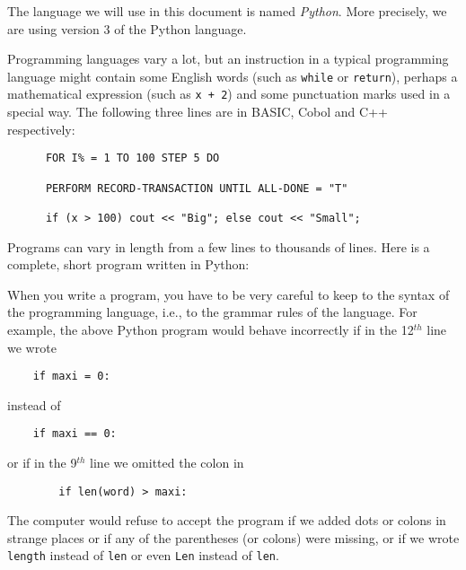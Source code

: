 
The language we will use in this document is named \emph{Python}.
More precisely, we are using version 3 of the Python language.

Programming languages vary a lot, but
an instruction in a typical programming language might contain
some English words (such as \verb!while! or \verb!return!), perhaps a mathematical
expression (such as \verb!x + 2!) and some punctuation marks used in a special way.
The following three lines are in BASIC, Cobol and C++ respectively:
\begin{Verbatim}
      FOR I% = 1 TO 100 STEP 5 DO

      PERFORM RECORD-TRANSACTION UNTIL ALL-DONE = "T"

      if (x > 100) cout << "Big"; else cout << "Small";
\end{Verbatim}

Programs can vary in length from a few lines to thousands of lines.
Here is a complete, short program written in Python:


\pagebreak

When you write a program, you have to be very careful to keep to the
syntax of the programming language, i.e., to the grammar rules of the language.
For example, the above Python program would
behave incorrectly if in the 12$^{th}$ line we wrote

\begin{Verbatim}
    if maxi = 0:
\end{Verbatim}

instead of 

\begin{Verbatim}
    if maxi == 0:
\end{Verbatim}

or if in the 9$^{th}$ line we omitted the colon in

\begin{Verbatim}
        if len(word) > maxi:
\end{Verbatim}

The computer would refuse to accept the program if we added dots or colons
in strange places
or if any of the parentheses (or colons) were missing, or if we wrote
\verb!length! instead of \verb!len! or even \verb!Len! instead of \verb!len!.

